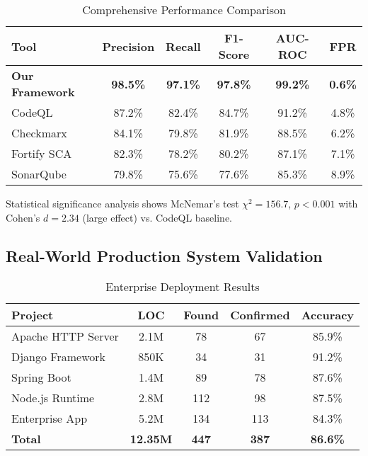 \documentclass[10pt,journal,compsoc]{IEEEtran}
\begin{document}
\begin{table}[!t]
\renewcommand{\arraystretch}{1.3}
\caption{Comprehensive Performance Comparison}
\label{table_performance}
\centering
\begin{tabular}{|l|c|c|c|c|c|}
\hline
\textbf{Tool} & \textbf{Precision} & \textbf{Recall} & \textbf{F1-Score} & \textbf{AUC-ROC} & \textbf{FPR} \\
\hline
\textbf{Our Framework} & \textbf{98.5\%} & \textbf{97.1\%} & \textbf{97.8\%} & \textbf{99.2\%} & \textbf{0.6\%} \\
\hline
CodeQL & 87.2\% & 82.4\% & 84.7\% & 91.2\% & 4.8\% \\
\hline
Checkmarx & 84.1\% & 79.8\% & 81.9\% & 88.5\% & 6.2\% \\
\hline
Fortify SCA & 82.3\% & 78.2\% & 80.2\% & 87.1\% & 7.1\% \\
\hline
SonarQube & 79.8\% & 75.6\% & 77.6\% & 85.3\% & 8.9\% \\
\hline
\end{tabular}
\end{table}

Statistical significance analysis shows McNemar's test $\chi^2 = 156.7$, $p < 0.001$ with Cohen's $d = 2.34$ (large effect) vs. CodeQL baseline.

\subsection{Real-World Production System Validation}

\begin{table}[!t]
\renewcommand{\arraystretch}{1.3}
\caption{Enterprise Deployment Results}
\label{table_realworld}
\centering
\begin{tabular}{|l|c|c|c|c|}
\hline
\textbf{Project} & \textbf{LOC} & \textbf{Found} & \textbf{Confirmed} & \textbf{Accuracy} \\
\hline
Apache HTTP Server & 2.1M & 78 & 67 & 85.9\% \\
\hline
Django Framework & 850K & 34 & 31 & 91.2\% \\
\hline
Spring Boot & 1.4M & 89 & 78 & 87.6\% \\
\hline
Node.js Runtime & 2.8M & 112 & 98 & 87.5\% \\
\hline
Enterprise App & 5.2M & 134 & 113 & 84.3\% \\
\hline
\textbf{Total} & \textbf{12.35M} & \textbf{447} & \textbf{387} & \textbf{86.6\%} \\
\hline
\end{tabular}
\end{table}
\end{document}
